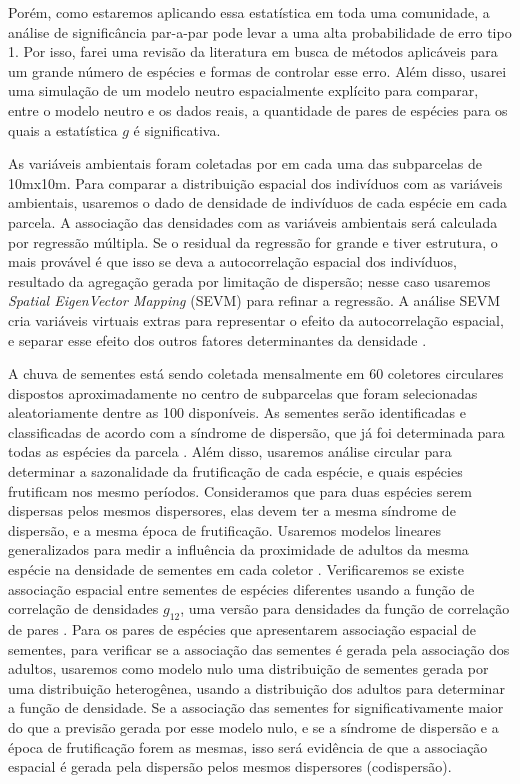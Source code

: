 \documentclass[twoside,12pt,a4paper]{report}
\begin{document}
Porém, como estaremos aplicando essa estatística em toda uma
comunidade, a análise de significância par-a-par pode levar a uma alta probabilidade de erro tipo 1.
Por isso, farei uma revisão da literatura em busca de métodos aplicáveis para um grande número de
espécies e formas de controlar esse erro. Além disso, usarei uma simulação de um modelo neutro
espacialmente explícito para comparar, entre o modelo neutro e os dados reais, a quantidade de pares de espécies para os quais a estatística
$g$ é significativa.

As variáveis ambientais foram coletadas por \cite{Kelly} em cada uma das subparcelas de 10mx10m.
Para comparar a distribuição espacial dos indivíduos com as variáveis ambientais, usaremos o dado de
densidade de indivíduos de cada espécie em cada parcela. 
A associação das densidades com as variáveis ambientais será calculada por regressão
múltipla. Se o residual da regressão for grande e tiver estrutura, o mais provável é que isso
se deva a autocorrelação espacial dos indivíduos, resultado da agregação gerada por limitação
de dispersão; nesse caso usaremos {\em Spatial
EigenVector Mapping} (SEVM) para refinar a regressão. A análise SEVM cria variáveis virtuais
extras para representar o efeito da autocorrelação espacial, e separar esse efeito dos outros
fatores determinantes da densidade \citep{refSEVM}.

A chuva de sementes está sendo coletada mensalmente em 60 coletores circulares dispostos
aproximadamente no centro de subparcelas que foram selecionadas aleatoriamente dentre as 100
disponíveis. As sementes serão identificadas e classificadas de acordo com a síndrome de
dispersão, que já foi determinada para todas as espécies da parcela \citep{martins2014}.
Além disso, usaremos análise circular para determinar a sazonalidade da frutificação de cada
espécie, e quais espécies frutificam nos mesmo períodos. Consideramos que para duas espécies
serem dispersas pelos mesmos dispersores, elas devem ter a mesma síndrome de dispersão, e a
mesma época de frutificação.
Usaremos modelos lineares generalizados para medir a influência da proximidade de adultos da mesma
espécie na densidade de sementes em cada coletor \citep{Hardesty2002}. 
Verificaremos se existe associação espacial entre sementes de espécies diferentes usando a
função de correlação de densidades $g_{12}$, uma versão para densidades da função de
correlação de pares \citep{Fedriani2015}. 
Para os pares de espécies que apresentarem associação espacial de sementes, para verificar se
a associação das sementes é gerada pela associação dos adultos, usaremos
como modelo nulo uma distribuição de sementes gerada por uma distribuição heterogênea, usando
a distribuição dos adultos para determinar a função de densidade.
Se a associação das sementes for significativamente maior do que a previsão gerada por esse modelo nulo,
e se a síndrome de dispersão e a época de frutificação forem as mesmas, isso será evidência
de que a associação espacial é gerada pela dispersão pelos mesmos dispersores (codispersão).
\end{document}
